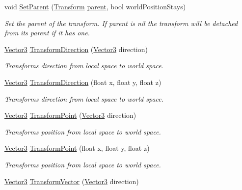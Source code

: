 \begin{DoxyCompactItemize}
void \mbox{\hyperlink{class_lua_1_1_transform_afcf05788f6ff8a51e7bc012ffe087727}{Set\+Parent}} (\mbox{\hyperlink{class_lua_1_1_transform}{Transform}} \mbox{\hyperlink{class_lua_1_1_transform_a8b6f784d7b29fbff37daec2e2001d991}{parent}}, bool world\+Position\+Stays)
\begin{DoxyCompactList}\small\item\em Set the parent of the transform. If parent is nil the transform will be detached from its parent if it has one. \end{DoxyCompactList}\item 
\mbox{\hyperlink{class_lua_1_1_vector3}{Vector3}} \mbox{\hyperlink{class_lua_1_1_transform_a14270ac6dbade453decf26513f533b66}{Transform\+Direction}} (\mbox{\hyperlink{class_lua_1_1_vector3}{Vector3}} direction)
\begin{DoxyCompactList}\small\item\em Transforms direction from local space to world space. \end{DoxyCompactList}\item 
\mbox{\hyperlink{class_lua_1_1_vector3}{Vector3}} \mbox{\hyperlink{class_lua_1_1_transform_ac828e92537ee4ca71ef3525f3f19511a}{Transform\+Direction}} (float x, float y, float z)
\begin{DoxyCompactList}\small\item\em Transforms direction from local space to world space. \end{DoxyCompactList}\item 
\mbox{\hyperlink{class_lua_1_1_vector3}{Vector3}} \mbox{\hyperlink{class_lua_1_1_transform_a77c8ed5338803453798fbfe848ed02e5}{Transform\+Point}} (\mbox{\hyperlink{class_lua_1_1_vector3}{Vector3}} direction)
\begin{DoxyCompactList}\small\item\em Transforms position from local space to world space. \end{DoxyCompactList}\item 
\mbox{\hyperlink{class_lua_1_1_vector3}{Vector3}} \mbox{\hyperlink{class_lua_1_1_transform_a77910db0422ec17545d411c1aeaec50b}{Transform\+Point}} (float x, float y, float z)
\begin{DoxyCompactList}\small\item\em Transforms position from local space to world space. \end{DoxyCompactList}\item 
\mbox{\hyperlink{class_lua_1_1_vector3}{Vector3}} \mbox{\hyperlink{class_lua_1_1_transform_a8a4bb1f1feb42a0d3be3577e4463f5f4}{Transform\+Vector}} (\mbox{\hyperlink{class_lua_1_1_vector3}{Vector3}} direction)

\end{DoxyCompactItemize}
